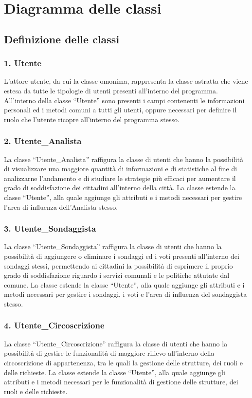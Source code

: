 \chapter{Diagramma delle classi}

\section{Definizione delle classi}

    \subsection*{1. Utente}
        L'attore utente, da cui la classe omonima, rappresenta la classe astratta che viene estesa da tutte le tipologie di utenti presenti all'interno del programma. All'interno della classe ``Utente'' sono presenti i campi contenenti le informazioni personali ed i metodi comuni a tutti gli utenti, oppure necessari per definire il ruolo che l'utente ricopre all'interno del programma stesso.

    \subsection*{2. Utente\_Analista}
        La classe ``Utente\_Analista'' raffigura la classe di utenti che hanno la possibilità di visualizzare una maggiore quantità di informazioni e di statistiche al fine di analizzarne l'andamento e di studiare le strategie più efficaci per aumentare il grado di soddisfazione dei cittadini all'interno della città. La classe estende la classe ``Utente'', alla quale aggiunge gli attributi e i metodi necessari per gestire l'area di influenza dell'Analista stesso.

    \subsection*{3. Utente\_Sondaggista}
        La classe ``Utente\_Sondaggista'' raffigura la classe di utenti che hanno la possibilità di aggiungere o eliminare i sondaggi ed i voti presenti all'interno dei sondaggi stessi, permettendo ai cittadini la possibilità di esprimere il proprio grado di soddisfazione riguardo i servizi comunali e le politiche attutate dal comune. La classe estende la classe ``Utente'', alla quale aggiunge gli attributi e i metodi necessari per gestire i sondaggi, i voti e l'area di influenza del sondaggista stesso.

    \subsection*{4. Utente\_Circoscrizione}
        La classe ``Utente\_Circoscrizione'' raffigura la classe di utenti che hanno la possibilità di gestire le funzionalità di maggiore rilievo all'interno della circoscrizione di appartenenza, tra le quali la gestione delle strutture, dei ruoli e delle richieste. La classe estende la classe ``Utente'', alla quale aggiunge gli attributi e i metodi necessari per le funzionalità di gestione delle strutture, dei ruoli e delle richieste.


